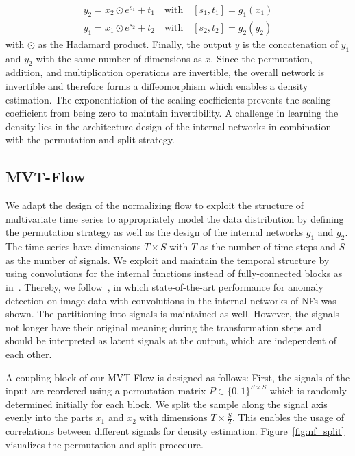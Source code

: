 \documentclass[journal]{IEEEtran}
\begin{document}
\begin{equation}
 \begin{aligned}
y_{2} = x_2 \odot e^{s_1} + t_1 \quad \text{with}\quad [s_1, t_1] = g_1(x_1)\\
y_{1} = x_1 \odot e^{s_2} + t_2\quad \text{with}\quad [s_2, t_2] = g_2(y_2)
\label{eq:coupling}
\end{aligned}
\end{equation}
with $\odot$ as the Hadamard product.
Finally, the output $y$ is the concatenation of $y_1$ and $y_2$ with the same number of dimensions as $x$.
{Since the permutation, addition, and multiplication operations are invertible, the overall network is invertible and therefore forms a diffeomorphism which enables a density estimation.}
The exponentiation of the scaling coefficients prevents the scaling coefficient from being zero to maintain invertibility.
A challenge in learning the density lies in the architecture design of the internal networks in combination with the permutation and split strategy.

\subsection{MVT-Flow}
\label{sec:mvtflow}
We adapt the design of the normalizing flow to exploit the structure of multivariate time series to appropriately model the data distribution {by defining the permutation strategy as well as the design of the internal networks $g_1$ and $g_2$.}
The time series have dimensions $T \times S$ with $T$ as the number of time steps and $S$ as the number of signals.
We exploit and maintain the temporal structure by using convolutions for the internal functions instead of fully-connected blocks as in~\cite{nf_time_series}.
{Thereby, we follow~\cite{csflow, ast}, in which state-of-the-art performance for anomaly detection on image data with convolutions in the internal networks of NFs was shown.}
The partitioning into signals is maintained as well.
However, the signals not longer have their original meaning during the transformation steps and should be interpreted as latent signals at the output, which are independent of each other.

A coupling block of our MVT-Flow is designed as follows:
First, the signals of the input are reordered using a permutation matrix $P\in \{0,1\}^{S\times S}$ which is randomly determined initially for each block.
We split the sample along the signal axis evenly into the parts $x_1$ and $x_2$ with dimensions $T\times \frac{S}{2}$.
This enables the usage of correlations between different signals for density estimation.
Figure~\ref{fig:nf_split} visualizes the permutation and split procedure.
\end{document}
